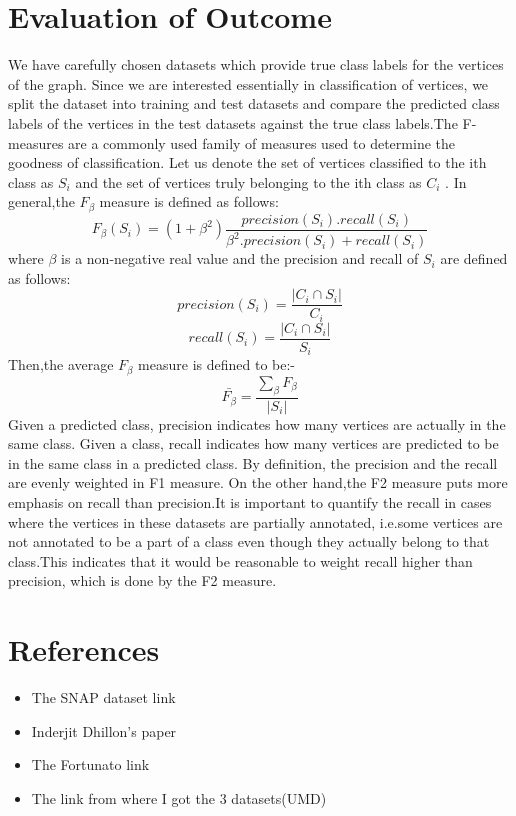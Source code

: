 \documentclass{article}
\begin{document}
\section*{Evaluation of Outcome}
We have carefully chosen datasets which provide true class labels for the vertices of the graph. Since we are interested essentially in classification of vertices, we split the dataset into training and test datasets and compare the predicted class labels of the vertices in the test datasets against the true class labels.The F-measures are a commonly used family of measures used to determine the goodness of classification. Let us denote the set of vertices classified to the ith class as $S_i$ and the set of vertices truly belonging to the ith class as $C_i$ . In general,the $F_{\beta}$ measure is defined as follows:
\begin{equation}
F_{\beta}(S_{i}) = (1+{\beta^2}) \frac{precision(S_{i}).recall(S_{i})}{{\beta^2}.precision(S_{i})+recall(S_{i})}
\end{equation}
where $\beta$ is a non-negative real value and the precision and recall of $S_i$ are defined as follows:
\begin{equation}
precision({S_{i}}) = \frac{ \left|{{C_{i}} \cap {S_{i}}}\right| }{ {C_{i}} } 
\end{equation} 
\begin{equation}
recall({S_{i}}) = \frac{ \left|{{C_{i}} \cap {S_{i}}}\right| }{ {S_{i}} } 
\end{equation} 
Then,the average $F_{\beta}$ measure is defined to be:-
\begin{equation}
\bar{F_{\beta}} = \frac{\sum_{\beta}{F_{\beta}}}{ \left|{S_{i}}\right| }
\end{equation}
Given a predicted class, precision indicates how many vertices are actually in the same class. Given a class, recall indicates how many vertices are predicted to be in the same class in a predicted class. By definition, the precision and the recall are evenly weighted in F1 measure. On the other hand,the F2 measure puts more emphasis on recall than precision.It is important to quantify the recall in cases where the vertices in these datasets are partially annotated, i.e.some vertices are not annotated to be a part of a class even though they actually belong to that class.This indicates that it would be reasonable to weight recall higher than precision, which is done by the F2 measure.

\section*{References}
\begin{itemize}
\item The SNAP dataset link
\item Inderjit Dhillon's paper
\item The Fortunato link 
\item The link from where I got the 3 datasets(UMD)

\end{itemize}
\end{document}
